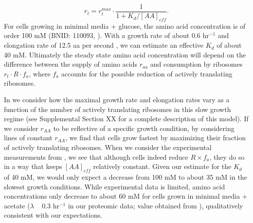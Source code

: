 \begin{equation}
r_t = r_t^{max} \cdot \frac{1}{1 + K_d / [AA]_{eff}}.
\label{eq:rate_Kd}
\end{equation}
For cells growing in minimal media + glucose, the amino acid concentration is of
order 100 mM  (BNID: 110093, \citep{milo2010, bennett2009}). With a growth rate
of about 0.6 hr$^{-1}$ and elongation rate of 12.5 aa per second
\citep{dai2016}, we can estimate an effective $K_d$ of about 40 mM. Ultimately
the steady state amino acid concentration will depend on the difference between
the supply of amino acids $r_{aa}$ and consumption by ribosomes $r_t \cdot R
\cdot f_a$, where $f_a$ accounts for the possible reduction of actively
translating ribosomes.

In  we consider how the maximal growth rate and
elongation rates vary as a function of the number of actively translating
ribosomes in this slow growth regime (see Supplemental Section XX for a complete
description of this model). If we consider $r_{AA}$ to be reflective of a specific
growth condition, by considering lines of constant $r_{AA}$, we find that cells
grow fastest by maximizing their fraction of actively translating ribosomes.
When we consider the experimental measurements from \cite{dai2018}, we see
that although cells indeed reduce $R \times f_a$, they do so in a way that keeps
$[AA]_{eff}$ relatively constant. Given our estimate for the $K_d$ of 40 mM,  we
would only expect a decrease from 100 mM to about 35 mM in the slowest growth
conditions. While experimental data is limited, amino acid concentrations only
decrease to about 60 mM for cells grown in minimal media + acetate ($\lambda$ ~
0.3 hr$^{-1}$ in our proteomic data; value obtained from \cite{bennett2009}),
qualitatively consistent with our expectations.

